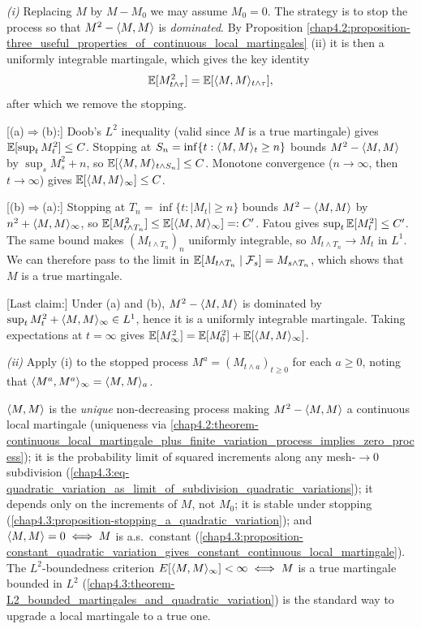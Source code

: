 \begin{proofidea}
\textit{(i)} Replacing $M$ by $M-M_0$ we may assume $M_0=0$. The strategy is to stop the process so that $M^2-\langle M,M\rangle$ is \emph{dominated}. By Proposition \ref{chap4.2:proposition-three_useful_properties_of_continuous_local_martingales} (ii) it is then a uniformly integrable martingale, which gives the key identity
$$\mathbb{E}[M_{t\wedge\tau}^2]=\mathbb{E}[\langle M,M\rangle_{t\wedge\tau}],$$
after which we remove the stopping.

[(a)$\Rightarrow$(b):] Doob's $L^2$ inequality (valid since $M$ is a true martingale) gives $\mathbb{E}[\sup_t M_t^2]\le C$. Stopping at $S_n=\inf\{t:\langle M,M\rangle_t\ge n\}$ bounds $M^2-\langle M,M\rangle$ by $\sup_s M_s^2+n$, so $\mathbb{E}[\langle M,M\rangle_{t\wedge S_n}]\le C$. Monotone convergence ($n\to\infty$, then $t\to\infty$) gives $\mathbb{E}[\langle M,M\rangle_\infty]\le C$.

[(b)$\Rightarrow$(a):] Stopping at $T_n=\inf\{t:|M_t|\ge n\}$ bounds $M^2-\langle M,M\rangle$ by $n^2+\langle M,M\rangle_\infty$, so $\mathbb{E}[M_{t\wedge T_n}^2]\le \mathbb{E}[\langle M,M\rangle_\infty]=:C'$. Fatou gives $\sup_t\mathbb{E}[M_t^2]\le C'$. The same bound makes $(M_{t\wedge T_n})_n$ uniformly integrable, so $M_{t\wedge T_n}\to M_t$ in $L^1$. We can therefore pass to the limit in $\mathbb{E}[M_{t\wedge T_n}\mid\mathcal F_s]=M_{s\wedge T_n}$, which shows that $M$ is a true martingale.

[Last claim:] Under (a) and (b), $M^2-\langle M,M\rangle$ is dominated by $\sup_t M_t^2+\langle M,M\rangle_\infty\in L^1$, hence it is a uniformly integrable martingale. Taking expectations at $t=\infty$ gives $\mathbb{E}[M_\infty^2]=\mathbb{E}[M_0^2]+\mathbb{E}[\langle M,M\rangle_\infty]$.

\textit{(ii)} Apply (i) to the stopped process $M^a=(M_{t\wedge a})_{t\ge0}$ for each $a\ge0$, noting that $\langle M^a,M^a\rangle_\infty=\langle M,M\rangle_a$.
\end{proofidea}
\begin{quizbox} $\langle M,M\rangle$ is the \emph{unique} non-decreasing process making $M^2-\langle M,M\rangle$ a continuous local martingale (uniqueness via \cref{chap4.2:theorem-continuous_local_martingale_plus_finite_variation_process_implies_zero_process}); it is the probability limit of squared increments along any mesh-$\to0$ subdivision (\cref{chap4.3:eq-quadratic_variation_as_limit_of_subdivision_quadratic_variations}); it depends only on the increments of $M$, not $M_0$; it is stable under stopping (\cref{chap4.3:proposition-stopping_a_quadratic_variation}); and $\langle M,M\rangle=0\iff M$ is a.s.\ constant (\cref{chap4.3:proposition-constant_quadratic_variation_gives_constant_continuous_local_martingale}). The $L^2$-boundedness criterion $E[\langle M,M\rangle_\infty]<\infty\iff M$ is a true martingale bounded in $L^2$ (\cref{chap4.3:theorem-L2_bounded_martingales_and_quadratic_variation}) is the standard way to upgrade a local martingale to a true one. \end{quizbox}

